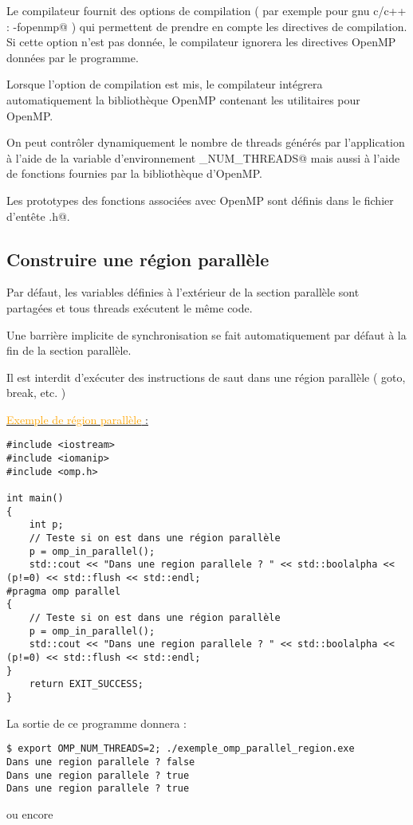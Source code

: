 \documentclass[fleqn,11pt]{article}
\begin{document}
Le compilateur fournit des options de compilation ( par exemple pour gnu c/c++ : \verb@-fopenmp@ ) qui permettent de prendre en compte
les directives de compilation. Si cette option n'est pas donnée, le compilateur ignorera les directives OpenMP données par le programme.

Lorsque l'option de compilation est mis, le compilateur intégrera automatiquement la bibliothèque OpenMP contenant les utilitaires pour
OpenMP. 

On peut contrôler dynamiquement le nombre de threads générés par l'application à l'aide de 
la variable d'environnement \verb@OMP_NUM_THREADS@ mais aussi à l'aide de fonctions fournies par la bibliothèque d'OpenMP.

Les prototypes des fonctions associées avec OpenMP sont définis dans le fichier d'entête \lstinline@omp.h@.

\subsection{Construire une région parallèle}

Par défaut, les variables définies à l'extérieur de la section parallèle
sont partagées et tous threads exécutent le même code.

Une barrière implicite de synchronisation se fait automatiquement par défaut à la fin de la section parallèle.

Il est interdit d'exécuter des instructions de saut dans une région parallèle ( goto, break, etc. )

\underline{\textcolor{orange}{Exemple de région parallèle} :}
\begin{lstlisting}
#include <iostream>
#include <iomanip>
#include <omp.h>

int main()
{
    int p;
    // Teste si on est dans une région parallèle
    p = omp_in_parallel();
    std::cout << "Dans une region parallele ? " << std::boolalpha << (p!=0) << std::flush << std::endl;
#pragma omp parallel
{
    // Teste si on est dans une région parallèle
    p = omp_in_parallel();
    std::cout << "Dans une region parallele ? " << std::boolalpha << (p!=0) << std::flush << std::endl;
}
    return EXIT_SUCCESS;
}\end{lstlisting}

La sortie de ce programme donnera :
\begin{verbatim}
$ export OMP_NUM_THREADS=2; ./exemple_omp_parallel_region.exe
Dans une region parallele ? false
Dans une region parallele ? true
Dans une region parallele ? true
\end{verbatim}
 ou encore
\end{document}
